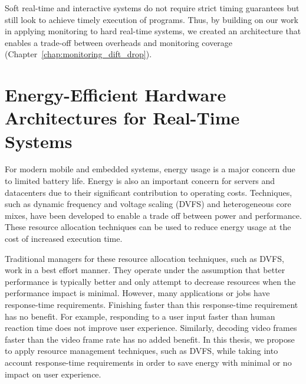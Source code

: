 Soft real-time and interactive systems do not require strict timing guarantees
but still look to achieve timely execution of programs. Thus, by building on
our work in applying monitoring to hard real-time systems, we created an
architecture that enables a trade-off between overheads and monitoring coverage
(Chapter~\ref{chap:monitoring_dift_drop}). 

\section{Energy-Efficient Hardware Architectures for Real-Time Systems}
\label{sec:intro.energy}

For modern mobile and embedded systems, energy usage is a major concern due to
limited battery life. Energy is also an important concern for servers and
datacenters due to their significant contribution to operating costs.
Techniques, such as dynamic frequency and voltage scaling (DVFS) and
heterogeneous core mixes, have been developed to enable a trade off between
power and performance. These resource allocation techniques can be used to
reduce energy usage at the cost of increased execution time.

Traditional managers for these resource allocation techniques, such as DVFS,
work in a best effort manner. They operate under the assumption that better
performance is typically better and only attempt to decrease resources when the
performance impact is minimal.  However, many applications or jobs have
response-time requirements.  Finishing faster than this response-time
requirement has no benefit. For example, responding to a user input faster than
human reaction time does not improve user experience. Similarly, decoding video
frames faster than the video frame rate has no added benefit. In this thesis,
we propose to apply resource management techniques, such as DVFS, while taking
into account response-time requirements in order to save energy with minimal or
no impact on user experience.


